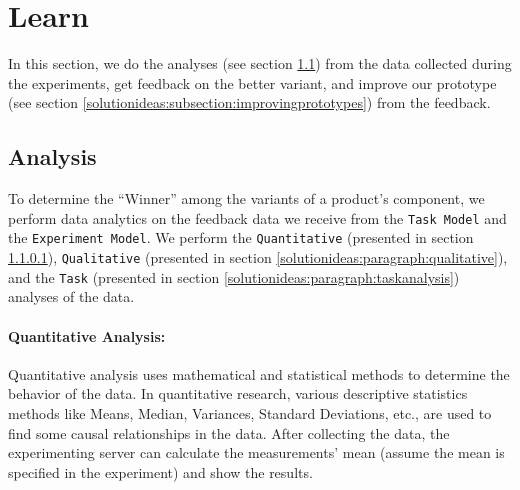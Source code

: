 \section{Learn}
In this section, we do the analyses (see section \ref{solutionideas:section:dataanalysis}) from the data collected during the experiments, get feedback on the better variant, and improve our prototype (see section \ref{solutionideas:subsection:improvingprototypes}) from the feedback.
\subsection{Analysis}
\label{solutionideas:section:dataanalysis}

To determine the ``Winner'' among the variants of a product's component, we perform data analytics on the feedback data we receive from the \texttt{Task Model} and the \texttt{Experiment Model}.
We perform the \texttt{Quantitative} (presented in section \ref{solutionideas:paragraph:quantitative}), \texttt{Qualitative} (presented in section \ref{solutionideas:paragraph:qualitative}), and the \texttt{Task} (presented in section \ref{solutionideas:paragraph:taskanalysis}) analyses of the data.


\paragraph{Quantitative Analysis:}
\label{solutionideas:paragraph:quantitative}
Quantitative analysis uses mathematical and statistical methods to determine the behavior of the data.
In quantitative research, various descriptive statistics methods like Means, Median, Variances, Standard Deviations, etc., are used to find some causal relationships in the data.
After collecting the data, the experimenting server can calculate the measurements' mean (assume the mean is specified in the experiment) and show the results.


